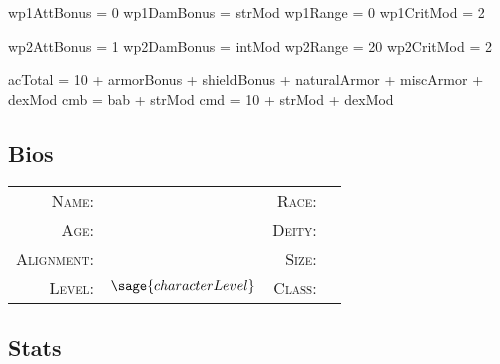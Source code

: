 \documentclass[10pt]{article}
\begin{document}



\newcommand{\armOneName}{Hide}
\newcommand{\armTwoName}{Shield}
\newcommand{\armOneBonus}{+4 Armor}
\newcommand{\armTwoBonus}{+2 Shield}
\begin{sagesilent}

	wp1AttBonus = 0
	wp1DamBonus = strMod
	wp1Range = 0
	wp1CritMod = 2
	
	wp2AttBonus = 1
	wp2DamBonus = intMod
	wp2Range = 20
	wp2CritMod = 2 

\end{sagesilent}

\newcommand{\wpOneName}{Club}
\newcommand{\wpTwoName}{Bomb}
\newcommand{\wpOneDam}{1d6}
\newcommand{\wpTwoDam}{5d6}
	
\begin{sagesilent}

	acTotal = 10 + armorBonus + shieldBonus + naturalArmor + miscArmor + dexMod
	cmb = bab + strMod
	cmd = 10 + strMod + dexMod

\end{sagesilent}

%
% 

\subsection*{Bios}
	\begin{tabular}{r l r l}
		\textsc{Name:} & \charName & \textsc{Race:} & \charRace \\
		\textsc{Age:} & \charAge & \textsc{Deity:} & \charGod \\
		\textsc{Alignment:} & \charAlign & \textsc{Size:} & \charSize \\
		\textsc{Level:} & \(\sage{characterLevel}\) & \textsc{Class:} & \class
	\end{tabular}

\subsection*{Stats}
\end{document}
